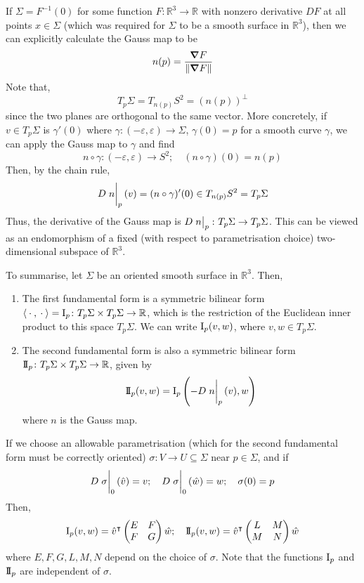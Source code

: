 \begin{remark}
	If \( \Sigma = F^{-1}(0) \) for some function \( F \colon \mathbb R^3 \to \mathbb R \) with nonzero derivative \( DF \) at all points \( x \in \Sigma \) (which was required for \( \Sigma \) to be a smooth surface in \( \mathbb R^3 \)), then we can explicitly calculate the Gauss map to be
	\[
		n(p) = \frac{\grad F}{\norm{\grad F}}
	\]
	Note that,
	\[
		T_p \Sigma = T_{n(p)} S^2 = (n(p))^\perp
	\]
	since the two planes are orthogonal to the same vector.
	More concretely, if \( v \in T_p \Sigma \) is \( \gamma'(0) \) where \( \gamma \colon (-\varepsilon, \varepsilon) \to \Sigma \), \( \gamma(0) = p \) for a smooth curve \( \gamma \), we can apply the Gauss map to \( \gamma \) and find
	\[
		n \circ \gamma \colon (-\varepsilon, \varepsilon) \to S^2;\quad (n \circ \gamma)(0) = n(p)
	\]
	Then, by the chain rule,
	\[
		D\eval{n}_p(v) = (n \circ \gamma)'(0) \in T_{n(p)} S^2 = T_p \Sigma
	\]
	Thus, the derivative of the Gauss map is \( D\eval{n}_p \colon T_p \Sigma \to T_p \Sigma \).
	This can be viewed as an endomorphism of a fixed (with respect to parametrisation choice) two-dimensional subspace of \( \mathbb R^3 \).

	To summarise, let \( \Sigma \) be an oriented smooth surface in \( \mathbb R^3 \).
	Then,
	\begin{enumerate}
		\item The first fundamental form is a symmetric bilinear form \( \left\langle{{}\cdot{},{}\cdot{}}\right\rangle = \operatorname{\mathrm{I}}_p \colon T_p \Sigma \times T_p \Sigma \to \mathbb R \), which is the restriction of the Euclidean inner product to this space \( T_p \Sigma \).
		      We can write \( \operatorname{\mathrm{I}}_p(v,w) \), where \( v, w \in T_p \Sigma \).
		\item The second fundamental form is also a symmetric bilinear form \( \operatorname{\mathrm{I\!I}}_p \colon T_p \Sigma \times T_p \Sigma \to \mathbb R \), given by
		      \[
			      \IIff_p(v,w) = \Iff_p\qty(-D\eval{n}_p(v), w)
		      \]
		      where \( n \) is the Gauss map.
	\end{enumerate}
	If we choose an allowable parametrisation (which for the second fundamental form must be correctly oriented) \( \sigma \colon V \to U \subseteq \Sigma \) near \( p \in \Sigma \), and if
	\[
		D \eval{\sigma}_0(\hat v) = v;\quad D \eval{\sigma}_0(\hat w) = w;\quad \sigma(0) = p
	\]
	Then,
	\[
		\operatorname{\mathrm{I}}_p(v,w) = {\hat v}^\intercal \begin{pmatrix}
			E & F \\
			F & G
		\end{pmatrix} \hat w;\quad \operatorname{\mathrm{I\!I}}_p(v,w) = {\hat v}^\intercal \begin{pmatrix}
			L & M \\
			M & N
		\end{pmatrix} \hat w
	\]
	where \( E, F, G, L, M, N \) depend on the choice of \( \sigma \).
	Note that the functions \( \operatorname{\mathrm{I}}_p \) and \( \operatorname{\mathrm{I\!I}}_p \) are independent of \( \sigma \).
\end{remark}
